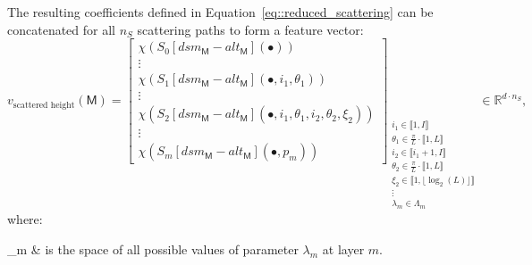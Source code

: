             The resulting coefficients defined in Equation~\ref{eq::reduced_scattering} can be concatenated for all \(n_S\) scattering paths to form a feature vector:
            \begin{equation}
                \label{eq::scatnet_height_based_features}
                v_{\text{scattered height}}\left(\mathsf{M}\right) = \begin{bmatrix}
                    \chi \left(S_0[dsm_{\mathsf{M}} - alt_{\mathsf{M}}]\left(\bullet\right)\right)\\
                    \vdots\\
                    \chi \left(S_1[dsm_{\mathsf{M}} - alt_{\mathsf{M}}]\left(\bullet, i_1, \theta_1\right)\right)\\
                    \vdots\\
                    \chi \left(S_2[dsm_{\mathsf{M}} - alt_{\mathsf{M}}]\left(\bullet, i_1, \theta_1, i_2, \theta_2, \xi_2\right)\right)\\
                    \vdots\\
                    \chi \left(S_m[dsm_{\mathsf{M}} - alt_{\mathsf{M}}]\left(\bullet, p_m\right)\right)
                \end{bmatrix}_{
                    \substack{
                        i_1 \in \llbracket 1, I \rrbracket\\
                        \theta_1 \in \frac{\pi}{L} \cdot \llbracket 1, L \rrbracket\\
                        i_2 \in \llbracket i_1 + 1, I \rrbracket\\
                        \theta_2 \in \frac{\pi}{L} \cdot \llbracket 1, L \rrbracket\\
                        \xi_2 \in \llbracket 1, \lfloor\log_2(L)\rfloor \rrbracket\\
                        \vdots\\
                        \lambda_m \in \Lambda_m
                    }
                } \in \mathbb{R}^{d \cdot n_S},
            \end{equation}
            where:
            \begin{conditions}
                \Lambda_m & is the space of all possible values of parameter \(\lambda_m\) at layer \(m\).
            \end{conditions}


